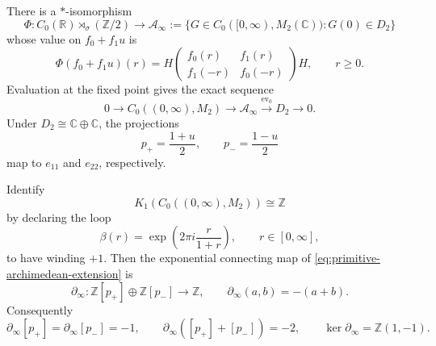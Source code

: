 \begin{theorem}
\label{thm:primitive-archimedean-boundary}
There is a $*$-isomorphism
\[
 \Phi:C_0(\mathbb R)\rtimes_\sigma(\mathbb Z/2)
 \longrightarrow
 \mathcal A_\infty
 :=\{G\in C_0([0,\infty),M_2(\mathbb C)):G(0)\in D_2\}
\]
whose value on $f_0+f_1u$ is
\begin{equation}
 \Phi(f_0+f_1u)(r)
 =H\begin{pmatrix}
       f_0(r)&f_1(r)\\
       f_1(-r)&f_0(-r)
    \end{pmatrix}H,\qquad r\geq0.
 \label{eq:primitive-archimedean-Phi}
\end{equation}
Evaluation at the fixed point gives the exact sequence
\begin{equation}
 0\longrightarrow C_0((0,\infty),M_2)
 \longrightarrow\mathcal A_\infty
 \xrightarrow{\operatorname{ev}_0}D_2\longrightarrow0.
 \label{eq:primitive-archimedean-extension}
\end{equation}
Under $D_2\cong\mathbb C\oplus\mathbb C$, the projections
\[
 p_+=\frac{1+u}{2},\qquad p_-=\frac{1-u}{2}
\]
map to $e_{11}$ and $e_{22}$, respectively.

Identify
\[
 K_1(C_0((0,\infty),M_2))\cong\mathbb Z
\]
by declaring the loop
\[
 \beta(r)=\exp\!\left(2\pi i\frac{r}{1+r}\right),\qquad
 r\in[0,\infty],
\]
to have winding $+1$.  Then the exponential connecting map of
\eqref{eq:primitive-archimedean-extension} is
\begin{equation}
 \partial_\infty:\mathbb Z[p_+]\oplus\mathbb Z[p_-]\longrightarrow\mathbb Z,
 \qquad
 \partial_\infty(a,b)=-(a+b).
 \label{eq:primitive-archimedean-boundary-map}
\end{equation}
Consequently
\[
 \partial_\infty[p_+]=\partial_\infty[p_-]=-1,\qquad
 \partial_\infty([p_+]+[p_-])=-2,\qquad
 \ker\partial_\infty=\mathbb Z(1,-1).
\]
\end{theorem}

